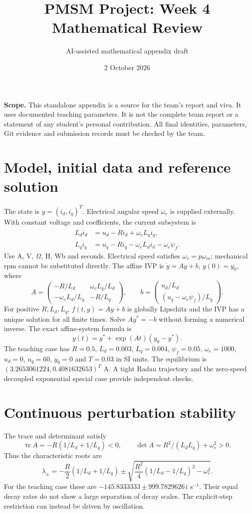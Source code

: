 \documentclass[11pt]{article}
\title{PMSM Project: Week 4 Mathematical Review}
\author{AI-assisted mathematical appendix draft}
\date{2 October 2026}
\begin{document}
\maketitle
\textbf{Scope.} This standalone appendix is a source for the team's report and viva.
It uses documented teaching parameters. It is not the complete team report or a
statement of any student's personal contribution. All final identities, parameters,
Git evidence and submission records must be checked by the team.

\section{Model, initial data and reference solution}
The state is $y=(i_d,i_q)^T$. Electrical angular speed $\omega_e$ is supplied externally.
With constant voltage and coefficients, the current subsystem is
\begin{align}
L_d\dot i_d&=u_d-Ri_d+\omega_eL_qi_q,\\
L_q\dot i_q&=u_q-Ri_q-\omega_e L_di_d-\omega_e\psi_f.
\end{align}
Use A, V, $\Omega$, H, Wb and seconds. Electrical speed satisfies
$\omega_e=p\omega_m$; mechanical rpm cannot be substituted directly.
The affine IVP is $\dot y=Ay+b$, $y(0)=y_0$, where
\[
A=\begin{pmatrix}-R/L_d&\omega_eL_q/L_d\\-\omega_eL_d/L_q&-R/L_q\end{pmatrix},
\qquad b=\begin{pmatrix}u_d/L_d\\(u_q-\omega_e\psi_f)/L_q\end{pmatrix}.
\]
For positive $R,L_d,L_q$, $f(t,y)=Ay+b$ is globally Lipschitz and the IVP has a
unique solution for all finite times. Solve $Ay^*=-b$ without forming a numerical inverse.
The exact affine-system formula is
\[
y(t)=y^*+\exp(At)(y_0-y^*).
\]
The teaching case has $R=0.5$, $L_d=0.003$, $L_q=0.004$, $\psi_f=0.05$,
$\omega_e=1000$, $u_d=0$, $u_q=60$, $y_0=0$ and $T=0.03$ in SI units.
The equilibrium is $(3.2653061224,0.4081632653)^T$ A. A tight Radau trajectory and
the zero-speed decoupled exponential special case provide independent checks.

\newpage
\section{Continuous perturbation stability}
The trace and determinant satisfy
\[
\operatorname{tr}A=-R(1/L_d+1/L_q)<0,\qquad
\det A=R^2/(L_dL_q)+\omega_e^2>0.
\]
Thus the characteristic roots are
\[
\lambda_\pm=-\frac R2(1/L_d+1/L_q)\pm
\sqrt{\frac{R^2}{4}(1/L_d-1/L_q)^2-\omega_e^2}.
\]
For the teaching case these are $-145.8333333\pm999.7829626\,\mathrm{i}$
$\mathrm{s}^{-1}$. Their equal decay rates do not show a large separation of decay scales.
The explicit-step restriction can instead be driven by oscillation.
\end{document}

